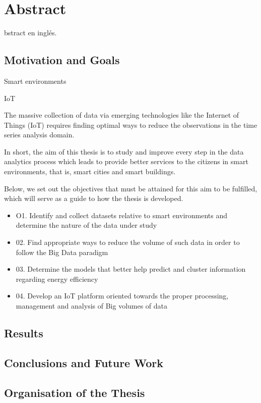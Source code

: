%
%
\let\textcircled=\pgftextcircled
{}
\chapter{Abstract}
\label{chap:abs}

bstract en inglés. 

\section{Motivation and Goals}


Smart environments

IoT



The massive collection of data via emerging technologies like the Internet of Things (IoT) requires finding optimal ways to
reduce the observations in the time series analysis domain.







In short, the aim of this thesis is to study and improve every step in the data analytics process which leads to provide better services to the citizens in smart environments, that is, smart cities and smart buildings.

Below, we set out the objectives that must be attained for this aim to be fulfilled, which will serve as a guide to how the thesis is developed.

\begin{itemize}

\item O1. Identify and collect datasets relative to smart environments and determine the nature of the data under study
\item 02. Find appropriate ways to reduce the volume of such data in order to follow the Big Data paradigm
\item 03. Determine the models that better help predict and cluster information regarding energy efficiency
\item 04. Develop an IoT platform oriented towards the proper processing, management and analysis of Big volumes of data 

\end{itemize}


\section{Results}


\section{Conclusions and Future Work}

\section{Organisation of the Thesis}
